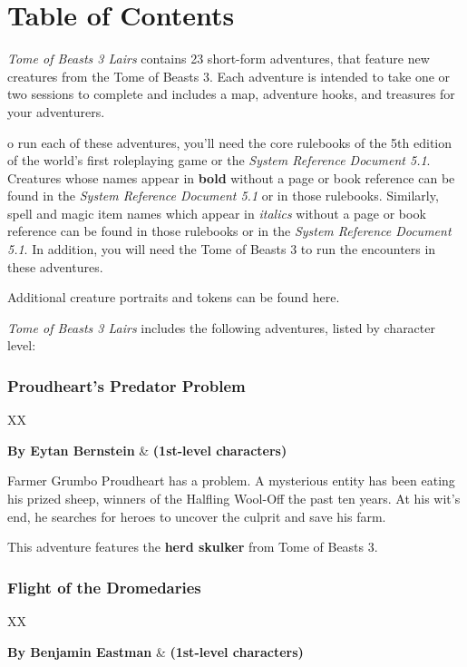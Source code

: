 \documentclass[10pt,a4paper,twoside,bg=print,twocolumn,openany,nodeprecatedcode]{dndbook}
\begin{document}
\tableofcontents
\newpage
\chapter{Table of Contents}
\textit{Tome of Beasts 3 Lairs} contains 23 short-form adventures, that feature new creatures from the Tome of Beasts 3. Each adventure is intended to take one or two sessions to complete and includes a map, adventure hooks, and treasures for your adventurers.

o run each of these adventures, you'll need the core rulebooks of the 5th edition of the world's first roleplaying game or the \textit{System Reference Document 5.1}. Creatures whose names appear in \textbf{bold} without a page or book reference can be found in the \textit{System Reference Document 5.1} or in those rulebooks. Similarly, spell and magic item names which appear in \textit{italics} without a page or book reference can be found in those rulebooks or in the \textit{System Reference Document 5.1}. In addition, you will need the Tome of Beasts 3 to run the encounters in these adventures.


Additional creature portraits and tokens can be found here.

\textit{Tome of Beasts 3 Lairs} includes the following adventures, listed by character level:

\subsection{Proudheart's Predator Problem}

\begin{DndTable}{XX}

\textbf{By Eytan Bernstein} & \textbf{(1st-level characters)}\\
\end{DndTable}

Farmer Grumbo Proudheart has a problem. A mysterious entity has been eating his prized sheep, winners of the Halfling Wool-Off the past ten years. At his wit's end, he searches for heroes to uncover the culprit and save his farm.

This adventure features the \textbf{herd skulker} from Tome of Beasts 3.

\subsection{Flight of the Dromedaries}

\begin{DndTable}{XX}

\textbf{By Benjamin Eastman} & \textbf{(1st-level characters)}\\
\end{DndTable}
\end{document}
